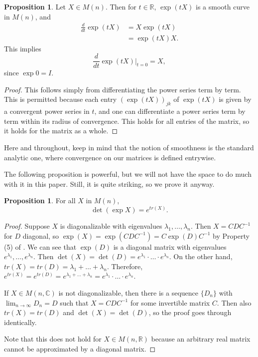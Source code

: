 \documentclass[12pt]{article}
\newcommand{\C}{\mathbb{C}}
\newcommand{\R}{\mathbb{R}}
\theoremstyle{definition}
\newtheorem{prop}[them]{Proposition}
\theoremstyle{definition}
\theoremstyle{definition}
\theoremstyle{definition}
\theoremstyle{definition}
\theoremstyle{definition}
\theoremstyle{definition}
\theoremstyle{definition}
\begin{document}
\begin{prop} Let $X \in M(n)$. Then for $t \in \R$,
$\exp(tX)$ is a smooth curve in
$M(n)$, and 
\[
\begin{aligned}
    \frac{d}{dt} \exp(tX) & = X\exp(tX) \\ 
    & = \exp(tX)X.
\end{aligned}
\] 
This implies
\[
    \frac{d}{dt} \exp(tX) \Big|_{t=0} = X,
\] 
since $\exp 0 = I$.
\end{prop}
\begin{proof} This follows simply from
differentiating the power series term by term.
This is permitted because each entry
${(\exp(tX))}_{jk}$ of $\exp(tX)$ is given by a
convergent power series in $t$, and one can
differentiate a power series term by term within
its radius of convergence. This holds for all
entries of the matrix, so it holds for the matrix
as a whole.
\end{proof}

\par{Here and throughout, keep in mind that the
notion of smoothness is the standard analytic one,
where convergence on our matrices is defined
entrywise.}

\vspace{6pt}
\par{The following proposition is powerful, but we will not have the space to do much with it in this paper. Still, it is quite striking, so we prove it anyway.}
\begin{prop}\label{prop:dettr} 
For all $X$ in $M(n)$,
\[
    \det(\exp X) = e^{tr(X)}.
\]
\end{prop}
\begin{proof}
\par{Suppose $X$ is diagonalizable with
eigenvalues $\lambda_1, \hdots, \lambda_n$. Then
$X = CDC^{-1}$ for $D$ diagonal, so $\exp(X) =
\exp(CDC^{-1}) = C\exp(D)C^{-1}$ by Property (5)
of . We can see that
$\exp(D)$ is a diagonal matrix with eigenvalues
$e^{\lambda_1}, \hdots, e^{\lambda_n}$. Then
$\det(X) = \det(D) = e^{\lambda_1}\cdot \hdots
\cdot e^{\lambda_n}$. On the other hand, $tr(X) =
tr(D) = \lambda_1 + \hdots + \lambda_n$. Therefore,
$e^{tr(X)} = e^{tr(D)} = e^{\lambda_1 + \hdots +
\lambda_n} = e^{\lambda_1} \cdot \hdots \cdot
e^{\lambda_n}$.}

\par{If $X \in M(n, \C)$ is not diagonalizable,
then there is a sequence $\{D_n\}$ with
$\lim_{n\to\infty}D_n = D$ such that $X =
CDC^{-1}$ for some invertible matrix $C$.
Then also $tr(X) = tr(D)$ and $\det(X) = \det(D)$,
so the proof goes through identically.}

\par{Note that this does not hold for $X \in M(n, \R)$
because an arbitrary real matrix cannot be
approximated by a diagonal matrix.}
\end{proof}
\end{document}
